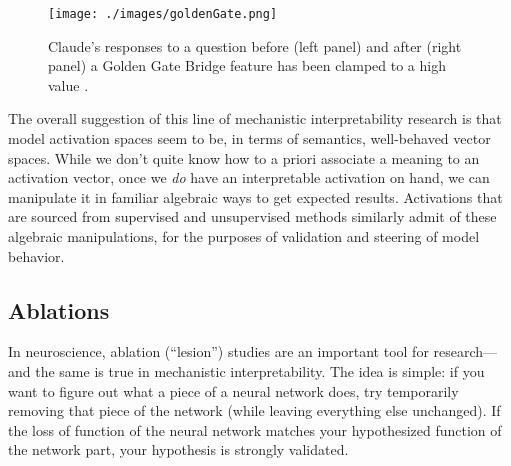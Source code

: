 \begin{figure}[ht]
\centering
\texttt{[image: ./images/goldenGate.png]}
\caption[Figure from \cite{templeton2024scaling}]{ Claude's responses to a
question before (left panel) and after (right panel) a Golden Gate Bridge
feature has been clamped to a high value \cite{templeton2024scaling}. }
\label{goldenGate}
\end{figure}

The overall suggestion of this line of mechanistic interpretability research is
that model activation spaces seem to be, in terms of semantics, well-behaved
vector spaces. While we don't quite know how to a priori associate a meaning to
an activation vector, once we \emph{do} have an interpretable activation on
hand, we can manipulate it in familiar algebraic ways to get expected results.
Activations that are sourced from supervised and unsupervised methods similarly
admit of these algebraic manipulations, for the purposes of validation and
steering of model behavior.


\subsection{Ablations}
In neuroscience, ablation (``lesion'') studies are an important tool for
research---and the same is true in mechanistic interpretability. The idea is
simple: if you want to figure out what a piece of a neural network does, try
temporarily removing that piece of the network (while leaving everything else
unchanged). If the loss of function of the neural network matches your
hypothesized function of the network part, your hypothesis is strongly
validated.

